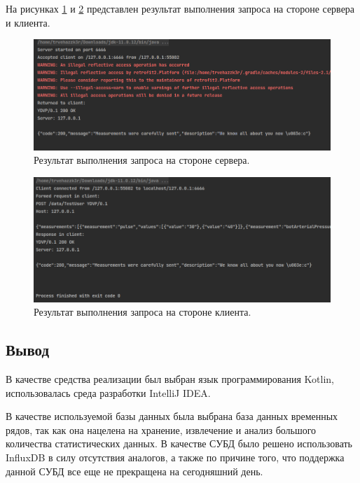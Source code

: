 На рисунках \ref{fig:serverExample} и \ref{fig:clientExample} представлен результат выполнения запроса на стороне сервера и клиента.

\begin{figure}[H]
	\centering
	\includegraphics[width=\textwidth]{img/serverOutput.png}
	\caption{Результат выполнения запроса на стороне сервера.}
	\label{fig:serverExample}
\end{figure}

\begin{figure}[H]
	\centering
	\includegraphics[width=\textwidth]{img/clientOutput.png}
	\caption{Результат выполнения запроса на стороне клиента.}
	\label{fig:clientExample}
\end{figure}

\subsection*{Вывод}
В качестве средства реализации был выбран язык программирования \newline Kotlin, использовалась среда разработки IntelliJ IDEA.

В качестве используемой базы данных была выбрана база данных временных рядов, так как она нацелена на хранение, извлечение и анализ большого количества статистических данных. В качестве СУБД было решено использовать InfluxDB в силу отсутствия аналогов, а также по причине того, что поддержка данной СУБД все еще не прекращена на сегодняшний день.

